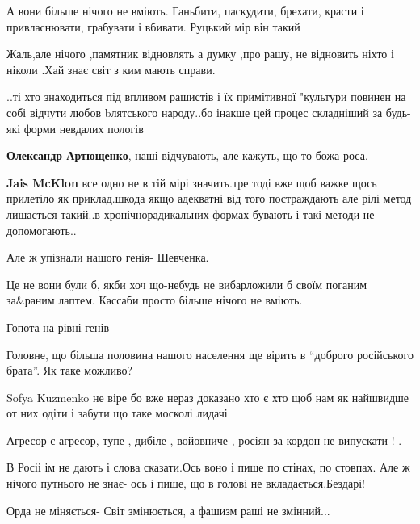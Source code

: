 \begin{itemize}
А вони більше нічого не вміють. Ганьбити, паскудити, брехати, красти і
привласнювати, грабувати і вбивати. Руцький мір він такий


Жаль,але нічого ,памятник відновлять а думку ,про рашу, не відновить ніхто і
ніколи .Хай знає світ з ким мають справи.


..ті хто знаходиться під впливом рашистів і їх примітивної "культури повинен на
собі відчути любов bлятського народу..бо інакше цей процес складніший за
будь-які форми невдалих пологів

\textbf{Олександр Артющенко}, наші відчувають, але кажуть, що то божа роса.


\textbf{Jais McKlon} все одно не в тій мірі значить.тре тоді вже щоб важке щось
прилетіло як приклад.шкода якщо адекватні від того постраждають але рілі метод
лишається такий..в хронічнорадикальних формах бувають і такі методи не
допомогають..


Але ж упізнали нашого генія- Шевченка.


Це не вони були б, якби хоч що-небудь не вибарложили б своїм поганим за\&раним
лаптем. Кассаби просто більше нічого не вміють.


Гопота на рівні генів

Головне, що більша половина нашого населення ще вірить в \enquote{доброго російського
брата}. Як таке можливо?


Sofya Kuzmenko не віре бо вже нераз доказано хто є хто щоб нам як найшвидше от
них одіти і забути що таке москолі лидачі


Агресор є агресор, тупе , дибіле , войовниче , росіян за кордон не випускати ! .

В Росіі ім не дають і слова сказати.Ось воно і пише по стінах, по стовпах. Але ж нічого путнього не знає- ось і пише, що в голові не вкладається.Бездарі!

Орда не міняється- Світ змінюється, а фашизм раші не змінний...


\end{itemize}
